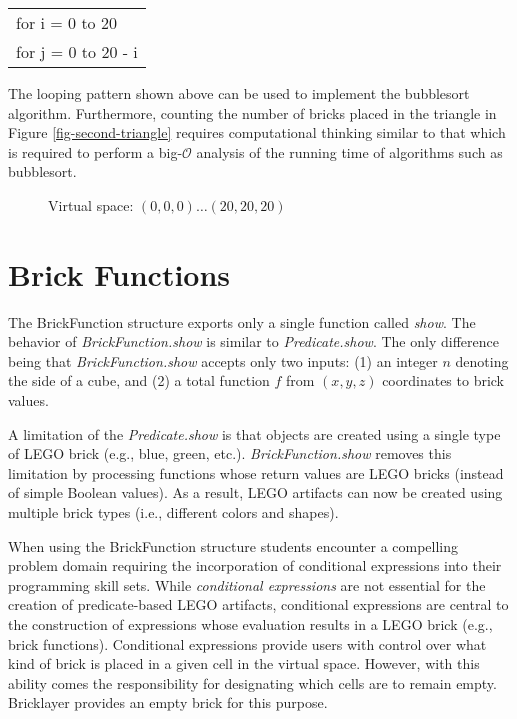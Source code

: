 \documentclass[submission,copyright,creativecommons]{eptcs}
\begin{document}
\begin{center}
\begin{tabular}{l}
for i = 0 to 20 \\
\qquad  for j = 0 to 20 - i
\end{tabular}
\end{center}

The looping pattern shown above can be used to implement the bubblesort algorithm. Furthermore, counting the number of bricks placed in the triangle in Figure \ref{fig-second-triangle} requires computational thinking similar to that which is required to perform a big-$\mathcal{O}$ analysis of the running time of algorithms such as bubblesort.


\begin{figure}[htb!]
\centering
{}
\caption{Virtual space: $(0,0,0)\dots(20,20,20)$}\label{fig-simplePyramid}
\end{figure}


\section{Brick Functions}\label{section-brick-functions}
The BrickFunction structure exports only a single function called \emph{show}. The behavior of \emph{BrickFunction.show} is similar to \emph{Predicate.show}. The only difference being that \emph{BrickFunction.show} accepts only two inputs: (1) an integer $n$ denoting the side of a cube, and (2) a total function $f$ from $(x,y,z)$ coordinates to brick values.

A limitation of the \emph{Predicate.show} is that objects are created using a single type of LEGO brick (e.g., blue, green, etc.). \emph{BrickFunction.show} removes this limitation by processing functions whose return values are LEGO bricks (instead of simple Boolean values). As a result, LEGO artifacts can now be created using multiple brick types (i.e., different colors and shapes).

When using the BrickFunction structure students encounter a compelling problem domain requiring the incorporation of conditional expressions into their programming skill sets.
While \emph{conditional expressions} are not essential for the creation of predicate-based LEGO artifacts, conditional expressions are central to the construction of expressions whose evaluation results in a LEGO brick (e.g., brick functions). Conditional expressions provide users with control over what kind of brick is placed in a given cell in the virtual space. However, with this ability comes the responsibility for designating which cells are to remain empty. Bricklayer provides an empty brick for this purpose.
\end{document}
